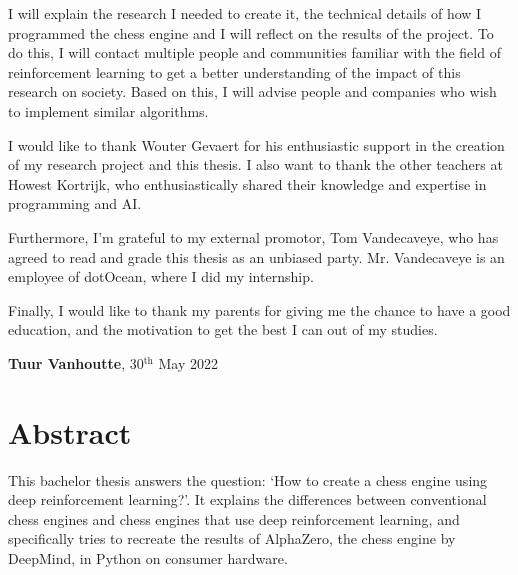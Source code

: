 \documentclass{article}
\begin{document}
I will explain the research I needed to create it, the technical details of how I programmed the
chess engine and I will reflect on the results of the project. To do this, I will contact 
multiple people and communities familiar with the field of reinforcement learning to get a better understanding of the
impact of this research on society. Based on this, I will advise people and companies who 
wish to implement similar algorithms.

I would like to thank Wouter Gevaert for his enthusiastic support in the creation of my research project 
and this thesis. I also want to thank the other teachers at Howest Kortrijk, who enthusiastically shared their knowledge
and expertise in programming and AI.

Furthermore, I'm grateful to my external promotor, Tom Vandecaveye, who has agreed to read and grade
this thesis as an unbiased party. Mr. Vandecaveye is an employee of dotOcean, where I did my internship.

Finally, I would like to thank my parents for giving me the chance to have a good education, and 
the motivation to get the best I can out of my studies.

\vspace{3em}

\begin{center}
    \textbf{Tuur Vanhoutte}, 30$^{\text{th}}$ May 2022
\end{center}

\newpage
\thispagestyle{empty}
\mbox{}
\newpage

\section*{Abstract}



This bachelor thesis answers the question: `How to create a chess engine using deep reinforcement learning?'.
It explains the differences between conventional chess engines and chess engines that use deep reinforcement learning, and
specifically tries to recreate the results of AlphaZero, the chess engine by DeepMind, in Python on consumer hardware. 
\end{document}
